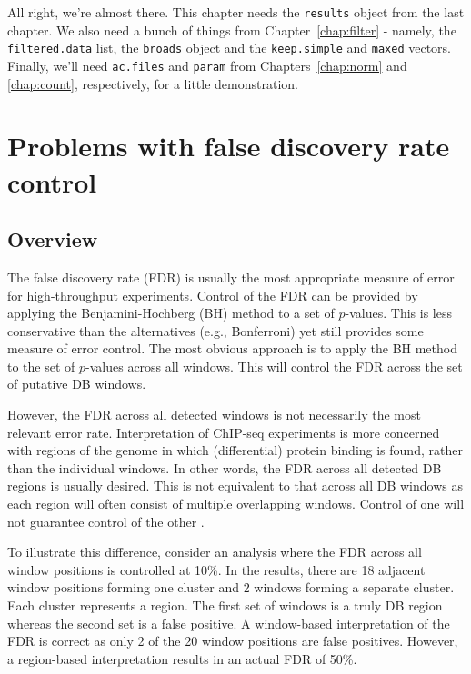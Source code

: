 \documentclass[12pt]{report}
\newcommand{\code}[1]{{\small\texttt{#1}}}
\newenvironment{combox}
{ \begin{shaded}\begin{center}\begin{minipage}[t]{0.95\textwidth} }
{ \end{minipage}\end{center}\end{shaded} }
\begin{document}
\begin{combox}
All right, we're almost there. 
This chapter needs the \code{results} object from the last chapter.
We also need a bunch of things from Chapter~\ref{chap:filter} - namely, the \code{filtered.data} list, the \code{broads} object and the \code{keep.simple} and \code{maxed} vectors.
Finally, we'll need \code{ac.files} and \code{param} from Chapters~\ref{chap:norm} and \ref{chap:count}, respectively, for a little demonstration.
\end{combox}

\section{Problems with false discovery rate control}

\subsection{Overview}
The false discovery rate (FDR) is usually the most appropriate measure of error for high-throughput experiments. 
Control of the FDR can be provided by applying the Benjamini-Hochberg (BH) method \citep{benjamini1995} to a set of $p$-values. 
This is less conservative than the alternatives (e.g., Bonferroni) yet still provides some measure of error control. 
The most obvious approach is to apply the BH method to the set of $p$-values across all windows. 
This will control the FDR across the set of putative DB windows.

However, the FDR across all detected windows is not necessarily the most relevant error rate. 
Interpretation of ChIP-seq experiments is more concerned with regions of the genome in which (differential) protein binding is found, rather than the individual windows.
In other words, the FDR across all detected DB regions is usually desired. 
This is not equivalent to that across all DB windows as each region will often consist of multiple overlapping windows.
Control of one will not guarantee control of the other \citep{lun2014}.

To illustrate this difference, consider an analysis where the FDR across all window positions is controlled at 10\%. 
In the results, there are 18 adjacent window positions forming one cluster and 2 windows forming a separate cluster.
Each cluster represents a region. 
The first set of windows is a truly DB region whereas the second set is a false positive. 
A window-based interpretation of the FDR is correct as only 2 of the 20 window positions are false positives.
However, a region-based interpretation results in an actual FDR of 50\%.
\end{document}
